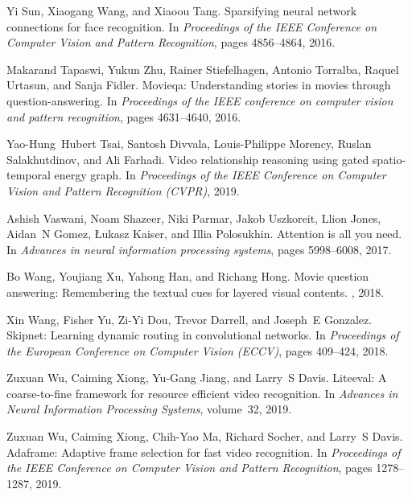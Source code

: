 \documentclass[final]{cvpr}
\begin{document}
{\begin{thebibliography}{10}
Yi Sun, Xiaogang Wang, and Xiaoou Tang.
\newblock Sparsifying neural network connections for face recognition.
\newblock In {\em Proceedings of the IEEE Conference on Computer Vision and
  Pattern Recognition}, pages 4856--4864, 2016.

Makarand Tapaswi, Yukun Zhu, Rainer Stiefelhagen, Antonio Torralba, Raquel
  Urtasun, and Sanja Fidler.
\newblock Movieqa: Understanding stories in movies through question-answering.
\newblock In {\em Proceedings of the IEEE conference on computer vision and
  pattern recognition}, pages 4631--4640, 2016.

Yao-Hung~Hubert Tsai, Santosh Divvala, Louis-Philippe Morency, Ruslan
  Salakhutdinov, and Ali Farhadi.
\newblock Video relationship reasoning using gated spatio-temporal energy
  graph.
\newblock In {\em Proceedings of the IEEE Conference on Computer Vision and
  Pattern Recognition (CVPR)}, 2019.

Ashish Vaswani, Noam Shazeer, Niki Parmar, Jakob Uszkoreit, Llion Jones,
  Aidan~N Gomez, {\L}ukasz Kaiser, and Illia Polosukhin.
\newblock Attention is all you need.
\newblock In {\em Advances in neural information processing systems}, pages
  5998--6008, 2017.

Bo Wang, Youjiang Xu, Yahong Han, and Richang Hong.
\newblock Movie question answering: Remembering the textual cues for layered
  visual contents.
, 2018.

Xin Wang, Fisher Yu, Zi-Yi Dou, Trevor Darrell, and Joseph~E Gonzalez.
\newblock Skipnet: Learning dynamic routing in convolutional networks.
\newblock In {\em Proceedings of the European Conference on Computer Vision
  (ECCV)}, pages 409--424, 2018.

Zuxuan Wu, Caiming Xiong, Yu-Gang Jiang, and Larry~S Davis.
\newblock Liteeval: A coarse-to-fine framework for resource efficient video
  recognition.
\newblock In {\em Advances in Neural Information Processing Systems},
  volume~32, 2019.

Zuxuan Wu, Caiming Xiong, Chih-Yao Ma, Richard Socher, and Larry~S Davis.
\newblock Adaframe: Adaptive frame selection for fast video recognition.
\newblock In {\em Proceedings of the IEEE Conference on Computer Vision and
  Pattern Recognition}, pages 1278--1287, 2019.


\end{thebibliography}}
\end{document}
